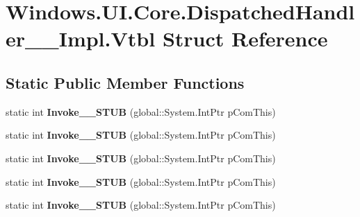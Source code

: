 \hypertarget{struct_windows_1_1_u_i_1_1_core_1_1_dispatched_handler_____impl_1_1_vtbl}{}\section{Windows.\+U\+I.\+Core.\+Dispatched\+Handler\+\_\+\+\_\+\+Impl.\+Vtbl Struct Reference}
\label{struct_windows_1_1_u_i_1_1_core_1_1_dispatched_handler_____impl_1_1_vtbl}
\subsection*{Static Public Member Functions}
\begin{DoxyCompactItemize}
\item 
\mbox{\label{struct_windows_1_1_u_i_1_1_core_1_1_dispatched_handler_____impl_1_1_vtbl_af86074d4845d54a6b8e5646b3428e28b}} 
static int {\bfseries Invoke\+\_\+\+\_\+\+S\+T\+UB} (global\+::\+System.\+Int\+Ptr p\+Com\+This)
\item 
\mbox{\label{struct_windows_1_1_u_i_1_1_core_1_1_dispatched_handler_____impl_1_1_vtbl_af86074d4845d54a6b8e5646b3428e28b}} 
static int {\bfseries Invoke\+\_\+\+\_\+\+S\+T\+UB} (global\+::\+System.\+Int\+Ptr p\+Com\+This)
\item 
\mbox{\label{struct_windows_1_1_u_i_1_1_core_1_1_dispatched_handler_____impl_1_1_vtbl_af86074d4845d54a6b8e5646b3428e28b}} 
static int {\bfseries Invoke\+\_\+\+\_\+\+S\+T\+UB} (global\+::\+System.\+Int\+Ptr p\+Com\+This)
\item 
\mbox{\label{struct_windows_1_1_u_i_1_1_core_1_1_dispatched_handler_____impl_1_1_vtbl_af86074d4845d54a6b8e5646b3428e28b}} 
static int {\bfseries Invoke\+\_\+\+\_\+\+S\+T\+UB} (global\+::\+System.\+Int\+Ptr p\+Com\+This)
\item 
\mbox{\label{struct_windows_1_1_u_i_1_1_core_1_1_dispatched_handler_____impl_1_1_vtbl_af86074d4845d54a6b8e5646b3428e28b}} 
static int {\bfseries Invoke\+\_\+\+\_\+\+S\+T\+UB} (global\+::\+System.\+Int\+Ptr p\+Com\+This)
\end{DoxyCompactItemize}
